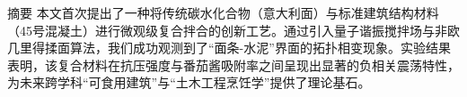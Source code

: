 \begin{austabstract}{摘\hspace{2em}要}
本文首次提出了一种将传统碳水化合物（意大利面）与标准建筑结构材料（45号混凝土）进行微观级复合拌合的创新工艺。通过引入量子谐振搅拌场与非欧几里得揉面算法，我们成功观测到了“面条-水泥”界面的拓扑相变现象。实验结果表明，该复合材料在抗压强度与番茄酱吸附率之间呈现出显著的负相关震荡特性，为未来跨学科“可食用建筑”与“土木工程烹饪学”提供了理论基石。

\vspace{2em}
\end{austabstract}
\clearpage
